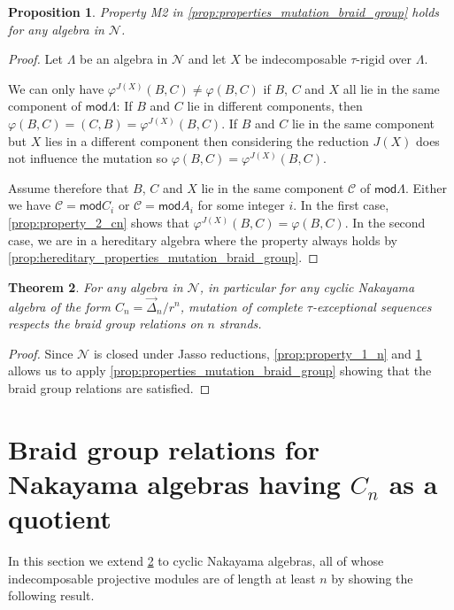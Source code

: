 \documentclass[11pt]{amsart}
\newcommand{\mods}{\mathsf{mod}}
\newtheorem{theorem}{Theorem}[section]
\newtheorem{proposition}[theorem]{Proposition}
\theoremstyle{definition}
\begin{document}
\begin{proposition}\label{prop:property_2_N}
    Property M2 in \cref{prop:properties_mutation_braid_group} holds for any algebra in $\mathcal{N}$. 
\end{proposition}

\begin{proof}
    Let $\Lambda$ be an algebra in $\mathcal{N}$ and let $X$ be indecomposable $\tau$-rigid over $\Lambda$.

    We can only have $\varphi^{J(X)}(B,C) \neq \varphi(B,C)$ if $B$, $C$ and $X$ all lie in the same component of $\mods \Lambda$: If $B$ and $C$ lie in different components, then $\varphi(B,C) = (C,B) = \varphi^{J(X)}(B,C)$. If $B$ and $C$ lie in the same component but $X$ lies in a different component then considering the reduction $J(X)$ does not influence the mutation so $\varphi(B,C) = \varphi^{J(X)}(B,C)$.
    
    Assume therefore that $B$, $C$ and $X$ lie in the same component $\mathcal{C}$ of $\mods \Lambda$. Either we have $\mathcal{C} = \mods C_i$ or $\mathcal{C} = \mods A_i$ for some integer $i$. In the first case, \cref{prop:property_2_cn} shows that $\varphi^{J(X)}(B,C) = \varphi(B,C)$. In the second case, we are in a hereditary algebra where the property always holds by \cref{prop:hereditary_properties_mutation_braid_group}.
\end{proof}

\begin{theorem}\label{thm:braid_group_relations_satisfied_on_cn}
    For any algebra in $\mathcal{N}$, in particular for any cyclic Nakayama algebra of the form $C_n =\overrightarrow{\Delta}_n/r^n$, mutation of complete $\tau$-exceptional sequences respects the braid group relations on $n$ strands.
\end{theorem}

\begin{proof}
    Since $\mathcal{N}$ is closed under Jasso reductions, \cref{prop:property_1_n} and \cref{prop:property_2_N} allows us to apply \cref{prop:properties_mutation_braid_group} showing that the braid group relations are satisfied. 
\end{proof}




\section{Braid group relations for Nakayama algebras having $C_n$ as a quotient}\label{sec:longerprojs}
In this section we extend \cref{thm:braid_group_relations_satisfied_on_cn} to cyclic Nakayama algebras, all of whose indecomposable projective modules are of length at least $n$ by showing the following result. 
\end{document}

